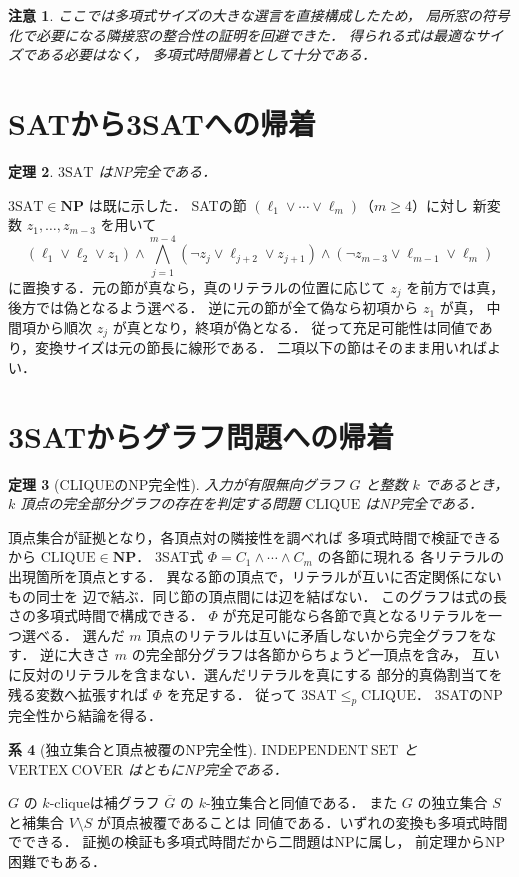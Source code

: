 \documentclass[a5paper,10pt,onecolumn]{jsarticle}
\makeatletter
\theoremstyle{mathnotetheorem}
\newtheorem{theorem}{定理}[section]
\newtheorem{corollary}[theorem]{系}
\newtheorem{remark}[theorem]{注意}
\renewcommand{\proofname}{証明}
\renewenvironment{proof}[1][\proofname]{%
  \par\pushQED{\qed}\normalfont\topsep4\p@\@plus2\p@\relax
  \trivlist\item[\hskip\labelsep\bfseries #1]\ignorespaces
}{\popQED\endtrivlist\@endpefalse}
\makeatother
\begin{document}
\begin{remark}
ここでは多項式サイズの大きな選言を直接構成したため，
局所窓の符号化で必要になる隣接窓の整合性の証明を回避できた．
得られる式は最適なサイズである必要はなく，
多項式時間帰着として十分である．
\end{remark}


\section{SATから3SATへの帰着}
\begin{theorem}
$\mathrm{3SAT}$ はNP完全である．
\end{theorem}
\begin{proof}
$\mathrm{3SAT}\in\mathbf{NP}$ は既に示した．
SATの節 $(\ell_1\vee\cdots\vee\ell_m)$（$m\ge4$）に対し
新変数 $z_1,\ldots,z_{m-3}$ を用いて
\[
 (\ell_1\vee\ell_2\vee z_1)\wedge
 \bigwedge_{j=1}^{m-4}(\neg z_j\vee\ell_{j+2}\vee z_{j+1})
 \wedge(\neg z_{m-3}\vee\ell_{m-1}\vee\ell_m)
\]
に置換する．元の節が真なら，真のリテラルの位置に応じて
$z_j$ を前方では真，後方では偽となるよう選べる．
逆に元の節が全て偽なら初項から $z_1$ が真，
中間項から順次 $z_j$ が真となり，終項が偽となる．
従って充足可能性は同値であり，変換サイズは元の節長に線形である．
二項以下の節はそのまま用いればよい．
\end{proof}


\section{3SATからグラフ問題への帰着}
\begin{theorem}[CLIQUEのNP完全性]
入力が有限無向グラフ $G$ と整数 $k$ であるとき，
$k$ 頂点の完全部分グラフの存在を判定する問題
$\mathrm{CLIQUE}$ はNP完全である．
\end{theorem}
\begin{proof}
頂点集合が証拠となり，各頂点対の隣接性を調べれば
多項式時間で検証できるから $\mathrm{CLIQUE}\in\mathbf{NP}$．
3SAT式 $\Phi=C_1\wedge\cdots\wedge C_m$ の各節に現れる
各リテラルの出現箇所を頂点とする．
異なる節の頂点で，リテラルが互いに否定関係にないもの同士を
辺で結ぶ．同じ節の頂点間には辺を結ばない．
このグラフは式の長さの多項式時間で構成できる．
$\Phi$ が充足可能なら各節で真となるリテラルを一つ選べる．
選んだ $m$ 頂点のリテラルは互いに矛盾しないから完全グラフをなす．
逆に大きさ $m$ の完全部分グラフは各節からちょうど一頂点を含み，
互いに反対のリテラルを含まない．選んだリテラルを真にする
部分的真偽割当てを残る変数へ拡張すれば $\Phi$ を充足する．
従って $\mathrm{3SAT}\le_p\mathrm{CLIQUE}$．
3SATのNP完全性から結論を得る．
\end{proof}
\begin{corollary}[独立集合と頂点被覆のNP完全性]
$\mathrm{INDEPENDENT\ SET}$ と $\mathrm{VERTEX\ COVER}$ はともにNP完全である．
\end{corollary}
\begin{proof}
$G$ の $k$-cliqueは補グラフ $\overline G$ の $k$-独立集合と同値である．
また $G$ の独立集合 $S$ と補集合 $V\setminus S$ が頂点被覆であることは
同値である．いずれの変換も多項式時間でできる．
証拠の検証も多項式時間だから二問題はNPに属し，
前定理からNP困難でもある．
\end{proof}
\end{document}
